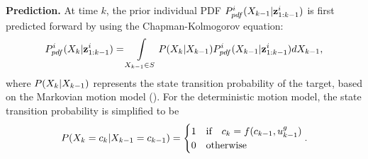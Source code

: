 	\textbf{Prediction.}
	At time $k$, the prior individual PDF $P^i_{pdf}(X_{k-1}|\mathbf{z}^i_{1:k-1})$ is first predicted forward by using the Chapman-Kolmogorov equation:
	\small
	\begin{equation}\label{eqn:bayes_pred}
	P^i_{pdf}(X_k|\mathbf{z}^i_{1:k-1})
	=\int\limits_{X_{k-1}\in S} P(X_k|X_{k-1})P^i_{pdf}(X_{k-1}|\mathbf{z}^i_{1:k-1})dX_{k-1},
	\end{equation}\normalsize
	where $P(X_k|X_{k-1})$ represents the state transition probability of the target, based on the Markovian motion model (). %
	For the deterministic motion model, the state transition probability is simplified to be
	\small\begin{equation}\label{eqn:markov_model}
	P(\X_k=c_k|\X_{k-1}=c_{k-1})=\begin{cases}
	1 & \text{if}\quad c_k=f(c_{k-1},u^g_{k-1})\\ %
	0 & \text{otherwise}
	\end{cases}.
	\end{equation}\normalsize
	
